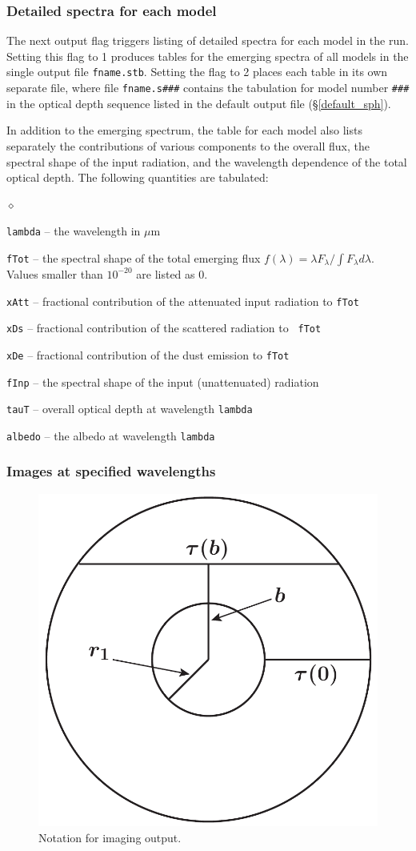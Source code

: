 \documentclass[11pt]{article}
\def\E#1{\hbox{$10^{#1}$}}
\def\mic    {\hbox{$\mu$m}}
\begin{document}
\subsubsection  {Detailed spectra for each model}
\label{fname.s}

The next output flag triggers listing of detailed spectra for each model in the
run.  Setting this flag to 1 produces tables for the emerging spectra of all
models in the single output file {\tt fname.stb}.  Setting the flag to 2 places
each table in its own separate file, where file {\tt fname.s\#\#\#} contains
the tabulation for model number {\tt \#\#\#} in the optical depth sequence
listed in the default output file (\S\ref{default_sph}).

In addition to the emerging spectrum, the table for each model also lists
separately the contributions of various components to the overall flux, the
spectral shape of the input radiation, and the wavelength dependence of the
total optical depth. The following quantities are tabulated:
\begin{list}{$\diamond$}{}
\item {\tt lambda} -- the wavelength in \mic
\item {\tt fTot} -- the spectral shape of the total emerging flux $f(\lambda) =
    \lambda F_\lambda/\int\!F_\lambda d\lambda$.  Values smaller than \E{-20}
    are listed as 0.
\item{\tt xAtt} -- fractional contribution of the attenuated input radiation to
    {\tt fTot}
\item{\tt xDs} -- fractional contribution of the scattered radiation to {\tt
    fTot}
\item{\tt xDe} -- fractional contribution of the dust emission to {\tt fTot}
\item{\tt fInp} -- the spectral shape of the input (unattenuated) radiation
\item{\tt tauT} -- overall optical depth at wavelength {\tt lambda}
\item{\tt albedo} -- the albedo at wavelength {\tt lambda}

\end{list}

\subsubsection{Images at specified wavelengths}
\label{imaging}

\begin{figure}[ht]
\centering
    \includegraphics[width=0.40\hsize]{figure1}
\caption{Notation for imaging output.}
\label{impact parameter}
\end{figure}
\end{document}

